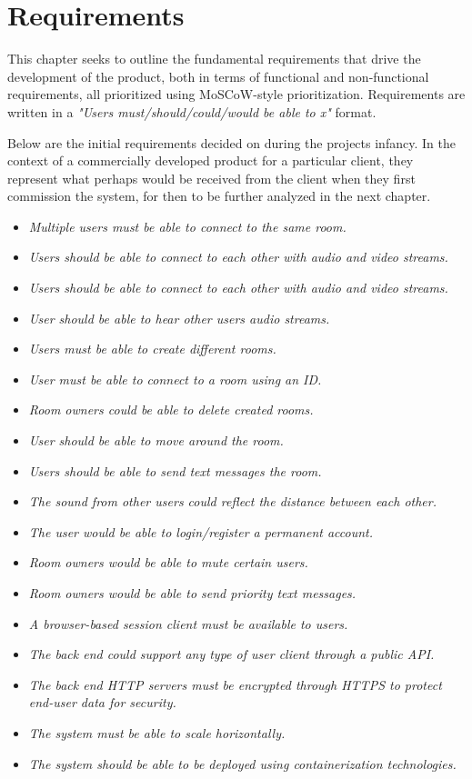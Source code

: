 \chapter{Requirements}

This chapter seeks to outline the fundamental requirements that drive the development of the product, both in terms of functional and non-functional requirements, all prioritized using MoSCoW-style prioritization. Requirements are written in a \textit{"Users must/should/could/would be able to x"} format.

Below are the initial requirements decided on during the projects infancy. In the context of a commercially developed product for a particular client, they represent what perhaps would be received from the client when they first commission the system, for then to be further analyzed in the next chapter.

\begin{itemize}

    \item \textit{Multiple users must be able to connect to the same room.}
    \item \textit{Users should be able to connect to each other with audio and video streams.}
    \item \textit{Users should be able to connect to each other with audio and video streams.}
    \item \textit{User should be able to hear other users audio streams.}
    \item \textit{Users must be able to create different rooms.}
    \item \textit{User must be able to connect to a room using an ID.}
    \item \textit{Room owners could be able to delete created rooms.}
    \item \textit{User should be able to move around the room.}
    \item \textit{Users should be able to send text messages the room.}
    \item \textit{The sound from other users could reflect the distance between each other.}
    \item \textit{The user would be able to login/register a permanent account.}
    \item \textit{Room owners would be able to mute certain users.}
    \item \textit{Room owners would be able to send priority text messages.}
    \item \textit{A browser-based session client must be available to users.}
    \item \textit{The back end could support any type of user client through a public API.}
    \item \textit{The back end HTTP servers must be encrypted through HTTPS to protect end-user data for security.}
    \item \textit{The system must be able to scale horizontally.}
    \item \textit{The system should be able to be deployed using containerization technologies.}
    
\end{itemize}


